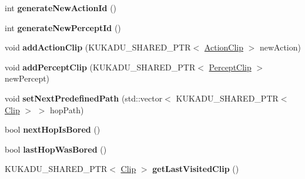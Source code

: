 \begin{DoxyCompactItemize}
\item 
int {\bfseries generate\+New\+Action\+Id} ()\hypertarget{classkukadu_1_1ProjectiveSimulator_a8734b5804fb4b278c832df2bc4e8ca08}{}\label{classkukadu_1_1ProjectiveSimulator_a8734b5804fb4b278c832df2bc4e8ca08}

\item 
int {\bfseries generate\+New\+Percept\+Id} ()\hypertarget{classkukadu_1_1ProjectiveSimulator_aca144fe3c78a30c1300bc064020415f6}{}\label{classkukadu_1_1ProjectiveSimulator_aca144fe3c78a30c1300bc064020415f6}

\item 
void {\bfseries add\+Action\+Clip} (K\+U\+K\+A\+D\+U\+\_\+\+S\+H\+A\+R\+E\+D\+\_\+\+P\+TR$<$ \hyperlink{classkukadu_1_1ActionClip}{Action\+Clip} $>$ new\+Action)\hypertarget{classkukadu_1_1ProjectiveSimulator_a83606ac15041cb91450822a1b5f0cb29}{}\label{classkukadu_1_1ProjectiveSimulator_a83606ac15041cb91450822a1b5f0cb29}

\item 
void {\bfseries add\+Percept\+Clip} (K\+U\+K\+A\+D\+U\+\_\+\+S\+H\+A\+R\+E\+D\+\_\+\+P\+TR$<$ \hyperlink{classkukadu_1_1PerceptClip}{Percept\+Clip} $>$ new\+Percept)\hypertarget{classkukadu_1_1ProjectiveSimulator_afc989736fc57a04245b6f7c9fb204512}{}\label{classkukadu_1_1ProjectiveSimulator_afc989736fc57a04245b6f7c9fb204512}

\item 
void {\bfseries set\+Next\+Predefined\+Path} (std\+::vector$<$ K\+U\+K\+A\+D\+U\+\_\+\+S\+H\+A\+R\+E\+D\+\_\+\+P\+TR$<$ \hyperlink{classkukadu_1_1Clip}{Clip} $>$ $>$ hop\+Path)\hypertarget{classkukadu_1_1ProjectiveSimulator_a6f0f3cb8481c1cf3c5597db2acd1d9ba}{}\label{classkukadu_1_1ProjectiveSimulator_a6f0f3cb8481c1cf3c5597db2acd1d9ba}

\item 
bool {\bfseries next\+Hop\+Is\+Bored} ()\hypertarget{classkukadu_1_1ProjectiveSimulator_a631dec0b20ff3314a91858ed43cf3b4a}{}\label{classkukadu_1_1ProjectiveSimulator_a631dec0b20ff3314a91858ed43cf3b4a}

\item 
bool {\bfseries last\+Hop\+Was\+Bored} ()\hypertarget{classkukadu_1_1ProjectiveSimulator_a9511320018bdf0e5e0e2131a8d2be4e4}{}\label{classkukadu_1_1ProjectiveSimulator_a9511320018bdf0e5e0e2131a8d2be4e4}

\item 
K\+U\+K\+A\+D\+U\+\_\+\+S\+H\+A\+R\+E\+D\+\_\+\+P\+TR$<$ \hyperlink{classkukadu_1_1Clip}{Clip} $>$ {\bfseries get\+Last\+Visited\+Clip} ()\hypertarget{classkukadu_1_1ProjectiveSimulator_a4143df271e8aef42fcfcebcffaf10e68}{}\label{classkukadu_1_1ProjectiveSimulator_a4143df271e8aef42fcfcebcffaf10e68}


\end{DoxyCompactItemize}

